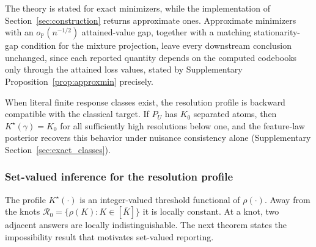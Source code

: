 \documentclass[11pt]{article}
\newcommand{\Pp}{\mathbb P}
\newcommand{\opro}{o_{\Pp}}
\begin{document}
The theory is stated for exact minimizers, while the implementation of Section~\ref{sec:construction} returns approximate ones. Approximate minimizers with an $\opro(n^{-1/2})$ attained-value gap, together with a matching stationarity-gap condition for the mixture projection, leave every downstream conclusion unchanged, since each reported quantity depends on the computed codebooks only through the attained loss values, stated by Supplementary Proposition~\ref{prop:approxmin} precisely.

When literal finite response classes exist, the resolution profile is backward compatible with the classical target. If $P_U$ has $K_0$ separated atoms, then $K^\star(\gamma)=K_0$ for all sufficiently high resolutions below one, and the feature-law posterior recovers this behavior 
under nuisance consistency alone (Supplementary Section~\ref{sec:exact_classes}).

\subsubsection{Set-valued inference for the resolution profile}\label{sec:profiletheory}

The profile $K^\star(\cdot)$ is an integer-valued threshold functional of $\rho(\cdot)$.  Away from the knots $\mathcal R_0=\{\rho(K):K\in[\overline K]\}$ it is locally constant. At a knot, two adjacent answers are locally indistinguishable.  The next theorem states the impossibility result that motivates set-valued reporting.
\end{document}
